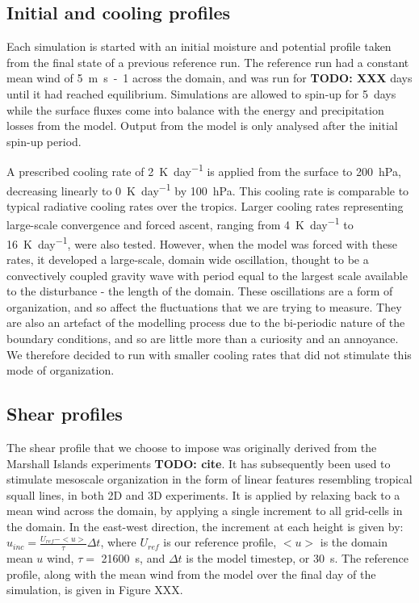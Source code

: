 \documentclass[11pt,a4paper]{article}
\newcommand\todo[1]{\textbf{TODO: #1}}
\begin{document}
\subsection{Initial and cooling profiles}

Each simulation is started with an initial moisture and potential profile taken from the final state of a previous reference run. The reference run had a constant mean wind of \SI{5}{m.s-1} across the domain, and was run for \todo{XXX} days until it had reached equilibrium. Simulations are allowed to spin-up for \SI{5}{days} while the surface fluxes come into balance with the energy and precipitation losses from the model. Output from the model is only analysed after the initial spin-up period.

A prescribed cooling rate of \SI{2}{K.day^{-1}} is applied from the surface to \SI{200}{hPa}, decreasing linearly to \SI{0}{K.day^{-1}} by \SI{100}{hPa}. This cooling rate is comparable to typical radiative cooling rates over the tropics. Larger cooling rates representing large-scale convergence and forced ascent, ranging from \SI{4}{K.day^{-1}} to \SI{16}{K.day^{-1}}, were also tested. However, when the model was forced with these rates, it developed a large-scale, domain wide oscillation, thought to be a convectively coupled gravity wave with period equal to the largest scale available to the disturbance - the length of the domain. These oscillations are a form of organization, and so affect the fluctuations that we are trying to measure. They are also an artefact of the modelling process due to the bi-periodic nature of the boundary conditions, and so are little more than a curiosity and an annoyance. We therefore decided to run with smaller cooling rates that did not stimulate this mode of organization.

\subsection{Shear profiles}

The shear profile that we choose to impose was originally derived from the Marshall Islands experiments \todo{cite}. It has subsequently been used to stimulate mesoscale organization in the form of linear features resembling tropical squall lines, in both 2D \cite{tompkins} and 3D \cite{grabowski, CC2006II} experiments. It is applied by relaxing back to a mean wind across the domain, by applying a single increment to all grid-cells in the domain. In the east-west direction, the increment at each height is given by: $u_{inc} = \frac{U_{ref} - <u>}{\tau} \Delta t$, where $U_{ref}$ is our reference profile, $<u>$ is the domain mean $u$ wind, $\tau = $ \SI{21600}{s}, and $\Delta t$ is the model timestep, or \SI{30}{s}. The reference profile, along with the mean wind from the model over the final day of the simulation, is given in Figure XXX.
\end{document}
